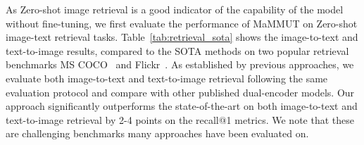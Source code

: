 \documentclass[10pt]{article} \usepackage[accepted]{tmlr}
\newcommand{\ours}{MaMMUT\xspace}
\begin{document}
\label{sec:retrieval}

As Zero-shot image retrieval is a good indicator of the capability of the model without fine-tuning, we first evaluate the performance of \ours on Zero-shot image-text retrieval tasks.
Table~\ref{tab:retrieval_sota} shows the image-to-text and text-to-image results, compared to the  SOTA methods on two popular retrieval benchmarks MS COCO~\citep{chen2015cococaptions} and Flickr~\citep{plummer2015flickr30k}. As established by previous approaches, we evaluate both image-to-text and text-to-image retrieval following the same evaluation protocol and compare with other published dual-encoder models. Our approach significantly outperforms the state-of-the-art on both image-to-text and text-to-image retrieval by 2-4 points on the recall@1 metrics.
We note that these are challenging benchmarks many approaches have been evaluated on. 
\end{document}
